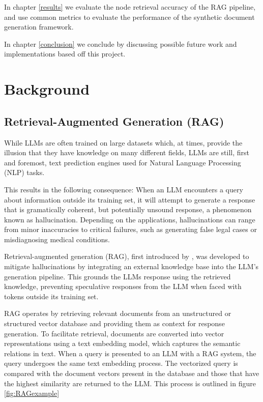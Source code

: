 In chapter \ref{results} we evaluate the node retrieval accuracy of the RAG pipeline, and use common metrics to evaluate the performance of the synthetic document generation framework.

In chapter \ref{conclusion} we conclude by discussing possible future work and implementations based off this project.

\section{Background}

\subsection{Retrieval-Augmented Generation (RAG)}
While LLMs are often trained on large datasets which, at times, provide the illusion that they have knowledge on many different fields, LLMs are still, first and foremost, text prediction engines used for Natural Language Processing (NLP) tasks.

This results in the following consequence: When an LLM encounters a query about information outside its training set, it will attempt to generate a response that is gramatically coherent, but potentially unsound response, a phenomenon known as hallucination. Depending on the applications, hallucinations can range from minor inaccuracies to critical failures, such as generating false legal cases \autocite{Bohannon_2024} or misdiagnosing medical conditions.

Retrieval-augmented generation (RAG), first introduced by \autocite{lewis2021retrievalaugmentedgenerationknowledgeintensivenlp}, was developed to mitigate hallucinations by integrating an external knowledge base into the LLM's generation pipeline. This grounds the LLMs response using the retrieved knowledge, preventing speculative responses from the LLM when faced with tokens outside its training set.

RAG operates by retrieving relevant documents from an unstructured or structured vector database and providing them as context for response generation. To facilitate retrieval, documents are converted into vector representations using a text embedding model, which captures the semantic relations in text. When a query is presented to an LLM with a RAG system, the query undergoes the same text embedding process. The vectorized query is compared with the document vectors present in the database and those that have the highest similarity are returned to the LLM. This process is outlined in figure \ref{fig:RAGexample}


